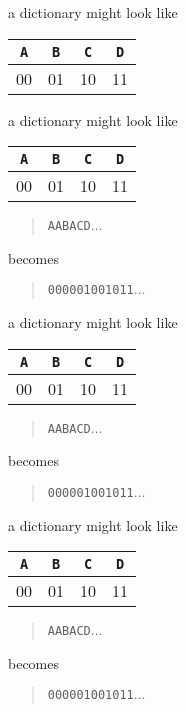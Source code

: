 \documentclass{beamer}
\newcommand{\cbla}{\color{black}}
\newcommand{\cred}{\color{red}}
\newcommand{\cblu}{\color{blue}}
\newcommand{\cgre}{\color{green}}
\newcommand{\letter}[1]{\color{blue}\texttt{#1}\color{black}}
\newcommand{\binary}[1]{\color{red}\texttt{#1}\color{black}}
\begin{document}
\begin{frame}{a dictionary might look like}
\begin{center}
\begin{tabular}{cccc}
\letter{A}&\letter{B}&\letter{C}&\letter{D}\\
\hline\cred
00&\cred 01&\cred 10&\cred 11
\cbla\end{tabular}
\end{center}
\end{frame}


\begin{frame}{a dictionary might look like}
\begin{center}
\begin{tabular}{cccc}
\letter{A}&\letter{B}&\letter{C}&\letter{D}\\
\hline\cred
00&\cred 01&\cred 10&\cred 11
\cbla\end{tabular}
\end{center}
  \begin{quote}
    \letter{AABACD}$\ldots$
  \end{quote}
  becomes
    \begin{quote}
    \binary{000001001011}$\ldots$
    \end{quote}
\end{frame}


\begin{frame}{a dictionary might look like}
\begin{center}
\begin{tabular}{cccc}
\letter{A}&\letter{B}&\letter{C}&\letter{D}\\
\hline\cred
00&\cred 01&\cred 10&\cred 11
\cbla\end{tabular}
\end{center}
  \begin{quote}
    \letter{\cgre A\cblu{}ABACD}$\ldots$
  \end{quote}
  becomes
    \begin{quote}
    \binary{\cgre 00\cred{}0001001011}$\ldots$
    \end{quote}
\end{frame}


\begin{frame}{a dictionary might look like}
\begin{center}
\begin{tabular}{cccc}
\letter{A}&\letter{B}&\letter{C}&\letter{D}\\
\hline\cred
00&\cred 01&\cred 10&\cred 11
\cbla\end{tabular}
\end{center}
  \begin{quote}
    \letter{A\cgre A\cblu{}BACD}$\ldots$
  \end{quote}
  becomes
    \begin{quote}
    \binary{00\cgre 00\cred{}01001011}$\ldots$
    \end{quote}
\end{frame}
\end{document}
